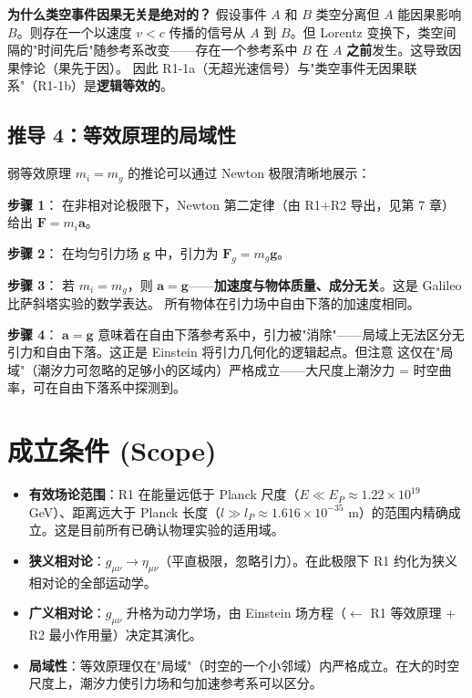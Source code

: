 \textbf{为什么类空事件因果无关是绝对的？} \fbox{[N]} 假设事件 $A$ 和 $B$ 类空分离但 $A$ 能因果影响 $B$。则存在一个以速度 $v < c$ 传播的信号从 $A$ 到 $B$。但 Lorentz 变换下，类空间隔的"时间先后"随参考系改变——存在一个参考系中 $B$ 在 $A$ \textbf{之前}发生。这导致因果悖论（果先于因）。\fbox{[S]} 因此 R1-1a（无超光速信号）与"类空事件无因果联系"（R1-1b）是\textbf{逻辑等效的}。

\subsection{推导 4：等效原理的局域性}

弱等效原理 $m_i = m_g$ 的推论可以通过 Newton 极限清晰地展示：

\textbf{步骤 1}：\fbox{[N]} 在非相对论极限下，Newton 第二定律（由 R1+R2 导出，见第 7 章）给出 $\mathbf{F} = m_i \mathbf{a}$。

\textbf{步骤 2}：\fbox{[N]} 在均匀引力场 $\mathbf{g}$ 中，引力为 $\mathbf{F}_g = m_g \mathbf{g}$。

\textbf{步骤 3}：\fbox{[S]} 若 $m_i = m_g$，则 $\mathbf{a} = \mathbf{g}$——\textbf{加速度与物体质量、成分无关}。这是 Galileo 比萨斜塔实验的数学表达。\fbox{[S]} 所有物体在引力场中自由下落的加速度相同。

\textbf{步骤 4}：\fbox{[S]} $\mathbf{a} = \mathbf{g}$ 意味着在自由下落参考系中，引力被"消除"——局域上无法区分无引力和自由下落。这正是 Einstein 将引力几何化的逻辑起点。但注意 \fbox{[N]} 这仅在"局域"（潮汐力可忽略的足够小的区域内）严格成立——大尺度上潮汐力 = 时空曲率，可在自由下落系中探测到。

\section{成立条件 (Scope)}

\begin{itemize}
  \item \textbf{有效场论范围}：R1 在能量远低于 Planck 尺度（$E \ll E_P \approx 1.22 \times 10^{19}$ GeV）、距离远大于 Planck 长度（$l \gg l_P \approx 1.616 \times 10^{-35}$ m）的范围内精确成立。这是目前所有已确认物理实验的适用域。
  \item \textbf{狭义相对论}：$g_{\mu\nu} \rightarrow \eta_{\mu\nu}$（平直极限，忽略引力）。在此极限下 R1 约化为狭义相对论的全部运动学。
  \item \textbf{广义相对论}：$g_{\mu\nu}$ 升格为动力学场，由 Einstein 场方程（$\leftarrow$ R1 等效原理 + R2 最小作用量）决定其演化。
  \item \textbf{局域性}：等效原理仅在"局域"（时空的一个小邻域）内严格成立。在大的时空尺度上，潮汐力使引力场和匀加速参考系可以区分。
\end{itemize}

